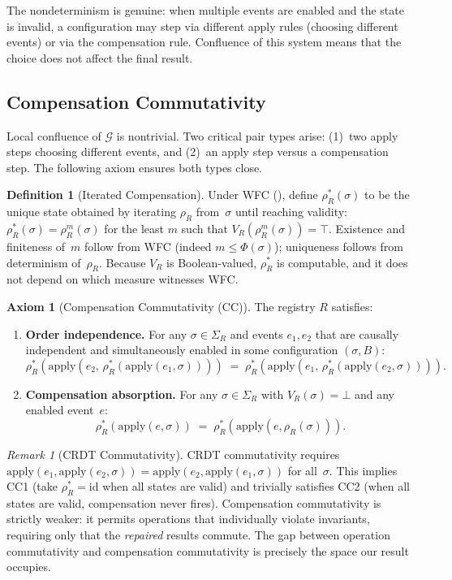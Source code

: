 \documentclass[11pt,a4paper]{article}
\theoremstyle{plain}
\theoremstyle{definition}
\newtheorem{definition}[theorem]{Definition}
\newtheorem{axiom}[theorem]{Axiom}
\theoremstyle{remark}
\newtheorem{remark}[theorem]{Remark}
\renewcommand{\_}{\textunderscore\allowbreak}
\begin{document}
The nondeterminism is genuine: when multiple events are enabled and the state
is invalid, a configuration may step via different apply rules (choosing
different events) or via the compensation rule.  Confluence of this system
means that the choice does not affect the final result.

\subsection{Compensation Commutativity}

Local confluence of $\mathcal{G}$ is nontrivial.  Two critical pair types
arise: (1)~two apply steps choosing different events, and (2)~an apply step
versus a compensation step.  The following axiom ensures both types close.

\begin{definition}[Iterated Compensation]
\label{def:rhostar}
Under WFC (), define $\rho_R^*(\sigma)$ to be the unique state
obtained by iterating $\rho_R$ from~$\sigma$ until reaching validity:
$\rho_R^*(\sigma) = \rho_R^{m}(\sigma)$ for the least $m$ such that
$V_R(\rho_R^{m}(\sigma)) = \top$.  Existence and finiteness of~$m$ follow from
WFC (indeed $m \le \Phi(\sigma)$); uniqueness follows from determinism
of~$\rho_R$.  Because $V_R$ is Boolean-valued, $\rho_R^*$ is computable, and it
does not depend on which measure witnesses WFC.
\end{definition}

\begin{axiom}[Compensation Commutativity (CC)]
\label{ax:cc}
The registry $R$ satisfies:
\begin{enumerate}[leftmargin=*,nosep]
\item[\textbf{(CC1)}] \textbf{Order independence.}\; For any
  $\sigma \in \Sigma_R$ and events $e_1, e_2$ that are causally independent
  and simultaneously enabled in some configuration $(\sigma, B)$:
  \[
  \rho_R^*(\mathrm{apply}(e_2,\, \rho_R^*(\mathrm{apply}(e_1, \sigma))))
  \;=\;
  \rho_R^*(\mathrm{apply}(e_1,\, \rho_R^*(\mathrm{apply}(e_2, \sigma)))).
  \]
\item[\textbf{(CC2)}] \textbf{Compensation absorption.}\; For any
  $\sigma \in \Sigma_R$ with $V_R(\sigma) = \bot$ and any enabled event~$e$:
  \[
  \rho_R^*(\mathrm{apply}(e, \sigma))
  \;=\;
  \rho_R^*(\mathrm{apply}(e, \rho_R(\sigma))).
  \]
\end{enumerate}
\end{axiom}

\begin{remark}[CRDT Commutativity]
\label{rem:crdt-comparison}
CRDT commutativity requires
$\mathrm{apply}(e_1, \mathrm{apply}(e_2, \sigma)) =
\mathrm{apply}(e_2, \mathrm{apply}(e_1, \sigma))$ for all~$\sigma$.  This
implies CC1 (take $\rho_R^* = \mathrm{id}$ when all states are valid) and
trivially satisfies CC2 (when all states are valid, compensation never fires).
Compensation commutativity is strictly weaker: it permits operations that
individually violate invariants, requiring only that the \emph{repaired}
results commute.  The gap between operation commutativity and compensation
commutativity is precisely the space our result occupies.
\end{remark}
\end{document}
